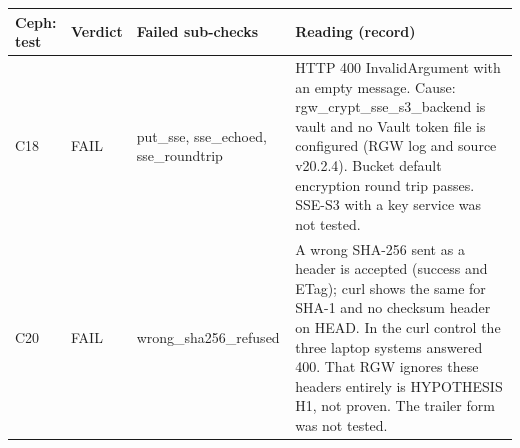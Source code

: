\begin{tabular}{@{}lp{2.0cm}p{3.6cm}p{7.0cm}@{}}
\toprule
Ceph: test & Verdict & Failed sub-checks & Reading (record) \\
\midrule
C18 & FAIL & put\_sse, sse\_echoed, sse\_roundtrip & HTTP 400 InvalidArgument with an empty message. Cause: rgw\_crypt\_sse\_s3\_backend is vault and no Vault token file is configured (RGW log and source v20.2.4). Bucket default encryption round trip passes. SSE-S3 with a key service was not tested. \\
C20 & FAIL & wrong\_sha256\_refused & A wrong SHA-256 sent as a header is accepted (success and ETag); curl shows the same for SHA-1 and no checksum header on HEAD. In the curl control the three laptop systems answered 400. That RGW ignores these headers entirely is HYPOTHESIS H1, not proven. The trailer form was not tested. \\
\bottomrule
\end{tabular}

